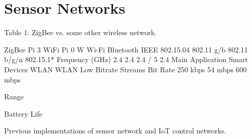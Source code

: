 \section{Sensor Networks}

Table 1. ZigBee vs. some other wireless network.



ZigBee
Pi 3 WiFi
Pi 0 W Wi-Fi
Bluetooth
IEEE
802.15.04
802.11 g/b
802.11 b/g/n
802.15.1*
Frequency (GHz)
2.4
2.4
2.4 / 5
2.4 
Main Application
Smart Devices
WLAN
WLAN
Low Bitrate Streams
Bit Rate
250 kbps
54 mbps
600 mbps

Range




Battery Life

Previous implementations of sensor network and IoT control networks.
